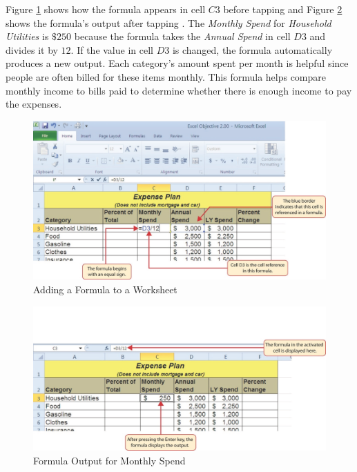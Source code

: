 Figure \ref{02:fig03} shows how the formula appears in cell $ C3 $ before tapping  and Figure \ref{02:fig04} shows the formula's output after tapping . The \textit{Monthly Spend} for \textit{Household Utilities} is $ \$250 $ because the formula takes the \textit{Annual Spend} in cell $ D3 $ and divides it by $ 12 $. If the value in cell $ D3 $ is changed, the formula automatically produces a new output. Each category's amount spent per month is helpful since people are often billed for these items monthly. This formula helps compare monthly income to bills paid to determine whether there is enough income to pay the expenses.

\begin{figure}[H]
	\centering
	\includegraphics[width=\maxwidth{.95\linewidth}]{gfx/ch02_fig03}
	\caption{Adding a Formula to a Worksheet}
	\label{02:fig03}
\end{figure}

\begin{figure}[H]
	\centering
	\includegraphics[width=\maxwidth{.95\linewidth}]{gfx/ch02_fig04}
	\caption{Formula Output for Monthly Spend}
	\label{02:fig04}
\end{figure}

